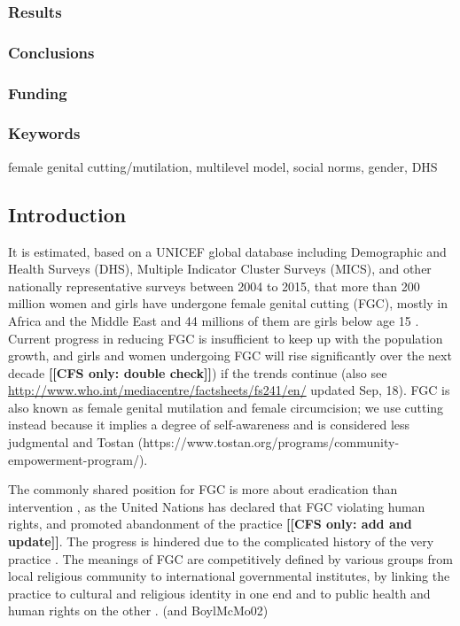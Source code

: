 \documentclass[12pt,]{article}
\newcommand{\comment}[1]{\textbf{[[#1]]}}
\newcommand{\cfonly}[1]{\comment{CFS only: #1}}
\begin{document}
\subsubsection{Results}\label{results}

\subsubsection{Conclusions}\label{conclusions}

\subsubsection{Funding}\label{funding}

\subsubsection{Keywords}\label{keywords}

female genital cutting/mutilation, multilevel model, social norms, gender, DHS

\subsection{Introduction}\label{introduction}

It is estimated, based on a UNICEF global database including Demographic and Health Surveys (DHS), Multiple Indicator Cluster Surveys (MICS),  and other nationally representative surveys between 2004 to 2015, that more than 200 million women and girls have undergone female genital cutting (FGC), mostly in Africa and the Middle East and 44 millions of them are girls below age 15 \cite{AdnrLesc16, UNIC16}.  Current progress in reducing FGC is insufficient to keep up with the population growth, and girls and women undergoing FGC will rise significantly over the next decade \cfonly{double check}) if the trends continue \cite{KhosBane17, UNIC16} (also see \url{http://www.who.int/mediacentre/factsheets/fs241/en/} updated Sep, 18).  FGC is also known as female genital mutilation and female circumcision; we use cutting instead because it implies a degree of self-awareness and is considered less judgmental \cite{KhahBark09, JohnEsse10, Meye00, PariSaru18, Shel01} and Tostan (https://www.tostan.org/programs/community-empowerment-program/).

The commonly shared position for FGC is more about eradication than intervention \cite{KhosBane17, Mack96, Toub94, UNIC16, WHO97}, as the United Nations has declared that FGC violating human rights, and promoted abandonment of the practice  \cite{WHO97, WHO08} \cfonly{add and update}.  The progress is hindered due to the complicated history of the very practice \cite{BergDeni12, Cami16}. The meanings of FGC are competitively defined by various groups from local religious community to international governmental institutes, by linking the practice to cultural and religious identity in one end and to public health and human rights on the other \cite{AhmeKare18, BergDeni13a, Boyl02, Grue01, KhosBane17, KimaShell18, SchuLien13, WHO12}. (and BoylMcMo02)
\end{document}
